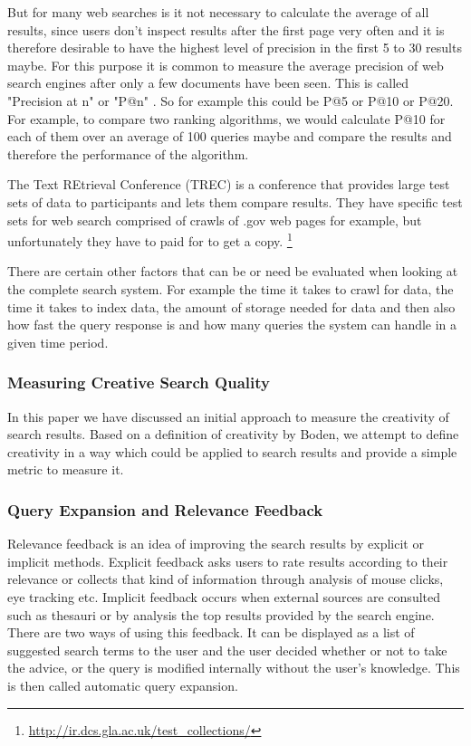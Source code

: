 But for many web searches is it not necessary to calculate the average of all results, since users don't inspect results after the first page very often and it is therefore desirable to have the highest level of precision in the first 5 to 30 results maybe. For this purpose it is common to measure the average precision of web search engines after only a few documents have been seen. This is called "Precision at n" or "P@n" \citep[p.140]{Baeza-Yates2011}. So for example this could be P@5 or P@10 or P@20. For example, to compare two ranking algorithms, we would calculate P@10 for each of them over an average of 100 queries maybe and compare the results and therefore the performance of the algorithm.

The Text REtrieval Conference (TREC) is a conference that provides large test sets of data to participants and lets them compare results. They have specific test sets for web search comprised of crawls of .gov web pages for example, but unfortunately they have to paid for to get a copy. \footnote{\url{http://ir.dcs.gla.ac.uk/test_collections/}}

There are certain other factors that can be or need be evaluated when looking at the complete search system. For example the time it takes to crawl for data, the time it takes to index data, the amount of storage needed for data and then also how fast the query response is and how many queries the system can handle in a given time period.

\subsubsection{Measuring Creative Search Quality}

In this paper \citep{Sawle2011} we have discussed an initial approach to measure the creativity of search results. Based on a definition of creativity by Boden, we attempt to define creativity in a way which could be applied to search results and provide a simple metric to measure it.

\subsubsection{Query Expansion and Relevance Feedback}

Relevance feedback is an idea of improving the search results by explicit or implicit methods. Explicit feedback asks users to rate results according to their relevance or collects that kind of information through analysis of mouse clicks, eye tracking etc. Implicit feedback occurs when external sources are consulted such as thesauri or by analysis the top results provided by the search engine. There are two ways of using this feedback. It can be displayed as a list of suggested search terms to the user and the user decided whether or not to take the advice, or the query is modified internally without the user's knowledge. This is then called automatic query expansion.


